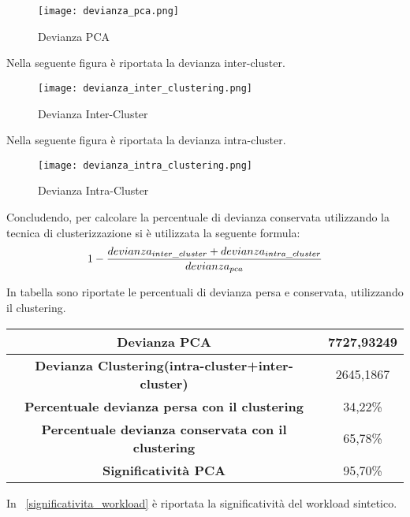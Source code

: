 \begin{figure}[!htbp]
	\texttt{[image: devianza\_pca.png]}
  \caption{Devianza PCA}
  \label{}
\end{figure}
\clearpage

Nella seguente figura è riportata la devianza inter-cluster.\\

\begin{figure}[!htbp]
	\texttt{[image: devianza\_inter\_clustering.png]}
  \caption{Devianza Inter-Cluster}
  \label{}
\end{figure}

Nella seguente figura è riportata la devianza intra-cluster.\\

\begin{figure}[!htbp]
	\texttt{[image: devianza\_intra\_clustering.png]}
  \caption{Devianza Intra-Cluster}
  \label{}
\end{figure}
\clearpage

Concludendo, per calcolare la percentuale di devianza conservata utilizzando la
tecnica di clusterizzazione si è utilizzata la seguente formula:
$$1-{devianza_{inter\_cluster}+devianza_{intra\_cluster}\over {devianza_{pca}}}$$

In tabella sono riportate le percentuali di devianza persa e conservata, utilizzando
il clustering.\\

\vspace{5 mm}

\begin{tabular}{|c|c|}
\hline
\textbf{Devianza PCA}	& 7727,93249 \\
\hline
\textbf{Devianza Clustering(intra-cluster+inter-cluster)}	& 2645,1867 \\
\hline
\textbf{Percentuale devianza persa con il clustering}	& 34,22\% \\
\hline
\textbf{Percentuale devianza conservata con il clustering}	& 65,78\% \\
\hline
\textbf{Significatività PCA} &	95,70\% \\
\hline
\end{tabular}

\vspace{5 mm}

In \figurename~\ref{significativita_workload} è riportata la significatività
del workload sintetico.\\

